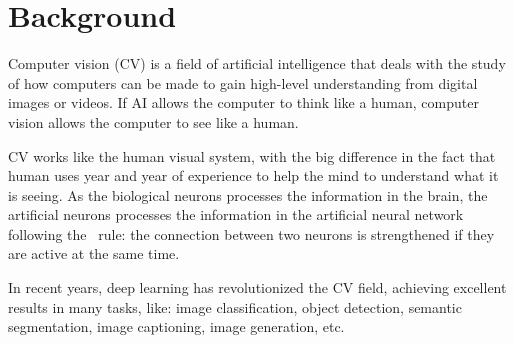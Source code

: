 \section{Background}\label{sec:background}
Computer vision (CV) is a field of artificial intelligence that deals with the study of how computers can be made to gain high-level understanding from digital images or videos.
If AI allows the computer to think like a human, computer vision allows the computer to see like a human.

CV works like the human visual system, with the big difference in the fact that human uses year and year of experience to help the mind to understand what it is seeing.
As the biological neurons processes the information in the brain, the artificial neurons processes the information in the artificial neural network following the~\cite{site:hebbian-plasticity} rule: the connection between two neurons is strengthened if they are active at the same time.

In recent years, deep learning has revolutionized the CV field, achieving excellent results in many tasks, like: image classification, object detection, semantic segmentation, image captioning, image generation, etc.

